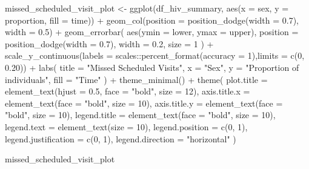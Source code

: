\documentclass[
  letterpaper,
  DIV=11,
  numbers=noendperiod]{scrartcl}
\newenvironment{Shaded}{\begin{snugshade}}{\end{snugshade}}
\newcommand{\AttributeTok}[1]{\textcolor[rgb]{0.40,0.45,0.13}{#1}}
\newcommand{\DecValTok}[1]{\textcolor[rgb]{0.68,0.00,0.00}{#1}}
\newcommand{\FloatTok}[1]{\textcolor[rgb]{0.68,0.00,0.00}{#1}}
\newcommand{\FunctionTok}[1]{\textcolor[rgb]{0.28,0.35,0.67}{#1}}
\newcommand{\NormalTok}[1]{\textcolor[rgb]{0.00,0.23,0.31}{#1}}
\newcommand{\OtherTok}[1]{\textcolor[rgb]{0.00,0.23,0.31}{#1}}
\newcommand{\SpecialCharTok}[1]{\textcolor[rgb]{0.37,0.37,0.37}{#1}}
\newcommand{\StringTok}[1]{\textcolor[rgb]{0.13,0.47,0.30}{#1}}
\begin{document}
\begin{Shaded}
\begin{Highlighting}[]
\NormalTok{missed\_scheduled\_visit\_plot }\OtherTok{\textless{}{-}}  \FunctionTok{ggplot}\NormalTok{(df\_hiv\_summary, }\FunctionTok{aes}\NormalTok{(}\AttributeTok{x =}\NormalTok{ sex, }\AttributeTok{y =}\NormalTok{ proportion, }\AttributeTok{fill =}\NormalTok{ time)) }\SpecialCharTok{+}
  \FunctionTok{geom\_col}\NormalTok{(}\AttributeTok{position =} \FunctionTok{position\_dodge}\NormalTok{(}\AttributeTok{width =} \FloatTok{0.7}\NormalTok{), }\AttributeTok{width =} \FloatTok{0.5}\NormalTok{) }\SpecialCharTok{+}
  \FunctionTok{geom\_errorbar}\NormalTok{(}
    \FunctionTok{aes}\NormalTok{(}\AttributeTok{ymin =}\NormalTok{ lower, }\AttributeTok{ymax =}\NormalTok{ upper),}
    \AttributeTok{position =} \FunctionTok{position\_dodge}\NormalTok{(}\AttributeTok{width =} \FloatTok{0.7}\NormalTok{),}
    \AttributeTok{width =} \FloatTok{0.2}\NormalTok{,}
    \AttributeTok{size =} \DecValTok{1}
\NormalTok{  ) }\SpecialCharTok{+}
  \FunctionTok{scale\_y\_continuous}\NormalTok{(}\AttributeTok{labels =}\NormalTok{ scales}\SpecialCharTok{::}\FunctionTok{percent\_format}\NormalTok{(}\AttributeTok{accuracy =} \DecValTok{1}\NormalTok{),}\AttributeTok{limits =} \FunctionTok{c}\NormalTok{(}\DecValTok{0}\NormalTok{, }\FloatTok{0.20}\NormalTok{)) }\SpecialCharTok{+}
  \FunctionTok{labs}\NormalTok{(}
    \AttributeTok{title =} \StringTok{"Missed Scheduled Visits"}\NormalTok{,}
    \AttributeTok{x =} \StringTok{"Sex"}\NormalTok{,}
    \AttributeTok{y =} \StringTok{"Proportion of individuals"}\NormalTok{,}
    \AttributeTok{fill =} \StringTok{"Time"}
\NormalTok{  ) }\SpecialCharTok{+}
  \FunctionTok{theme\_minimal}\NormalTok{() }\SpecialCharTok{+}
  \FunctionTok{theme}\NormalTok{(}
    \AttributeTok{plot.title =} \FunctionTok{element\_text}\NormalTok{(}\AttributeTok{hjust =} \FloatTok{0.5}\NormalTok{, }\AttributeTok{face =} \StringTok{"bold"}\NormalTok{, }\AttributeTok{size =} \DecValTok{12}\NormalTok{),}
    \AttributeTok{axis.title.x =} \FunctionTok{element\_text}\NormalTok{(}\AttributeTok{face =} \StringTok{"bold"}\NormalTok{, }\AttributeTok{size =} \DecValTok{10}\NormalTok{),}
    \AttributeTok{axis.title.y =} \FunctionTok{element\_text}\NormalTok{(}\AttributeTok{face =} \StringTok{"bold"}\NormalTok{, }\AttributeTok{size =} \DecValTok{10}\NormalTok{),}
    \AttributeTok{legend.title =} \FunctionTok{element\_text}\NormalTok{(}\AttributeTok{face =} \StringTok{"bold"}\NormalTok{, }\AttributeTok{size =} \DecValTok{10}\NormalTok{),}
    \AttributeTok{legend.text =} \FunctionTok{element\_text}\NormalTok{(}\AttributeTok{size =} \DecValTok{10}\NormalTok{),}
    \AttributeTok{legend.position =} \FunctionTok{c}\NormalTok{(}\DecValTok{0}\NormalTok{, }\DecValTok{1}\NormalTok{),}
    \AttributeTok{legend.justification =} \FunctionTok{c}\NormalTok{(}\DecValTok{0}\NormalTok{, }\DecValTok{1}\NormalTok{),}
    \AttributeTok{legend.direction =} \StringTok{"horizontal"}
\NormalTok{  )}

\NormalTok{missed\_scheduled\_visit\_plot}
\end{Highlighting}
\end{Shaded}
\end{document}
